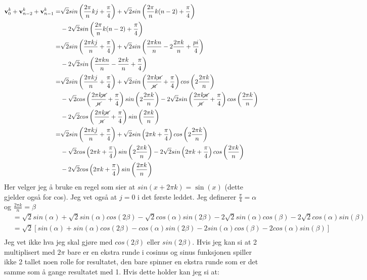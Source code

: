 \documentclass[a4paper,12pt,norsk]{article}
\begin{document}
\begin{align*}
\bold{v}^k_0 +\bold{v}^k_{n-2} + \bold{v}^k_{n-1} =& \sqrt{2}sin\left(\frac{2\pi}{n}kj + \frac{\pi}{4}\right) + \sqrt{2}sin\left(\frac{2\pi}{n}k(n-2) + \frac{\pi}{4} \right)\\ &-2\sqrt{2}sin\left(\frac{2\pi}{n}k(n-2) + \frac{\pi}{4} \right)\\
=& \sqrt{2}sin\left(\frac{2\pi kj}{n} + \frac{\pi}{4}\right) + \sqrt{2}sin\left(\frac{2\pi kn}{n} -2\frac{2\pi k}{n} + \frac{pi}{4}\right) \\
&-2\sqrt{2}sin\left(\frac{2\pi kn}{n} - \frac{2\pi k}{n} + \frac{\pi}{4} \right)\\
=& \sqrt{2}sin\left(\frac{2\pi kj}{n} + \frac{\pi}{4}\right) + \sqrt{2}sin\left(\frac{2\pi k\cancel{n}}{\cancel{n}} + \frac{\pi}{4}\right)cos\left(2\frac{2\pi k}{n} \right) \\
& - \sqrt{2}cos\left(\frac{2\pi k\cancel{n}}{\cancel{n}} + \frac{\pi}{4}\right)sin\left(2\frac{2\pi k}{n} \right) -2\sqrt{2}sin\left(\frac{2\pi k\cancel{n}}{\cancel{n}} + \frac{\pi}{4}\right)cos\left(\frac{2\pi k}{n} \right)\\
&-2\sqrt{2}cos\left(\frac{2\pi k\cancel{n}}{\cancel{n}} + \frac{\pi}{4}\right)sin\left(\frac{2\pi k}{n} \right) \\
=& \sqrt{2}sin\left(\frac{2\pi kj}{n} + \frac{\pi}{4}\right) + \sqrt{2}sin\left(2\pi k + \frac{\pi}{4}\right)cos\left(2\frac{2\pi k}{n} \right) \\
& - \sqrt{2}cos\left(2\pi k + \frac{\pi}{4}\right)sin\left(2\frac{2\pi k}{n} \right) -2\sqrt{2}sin\left(2\pi k + \frac{\pi}{4}\right)cos\left(\frac{2\pi k}{n} \right)\\
&-2\sqrt{2}cos\left(2\pi k + \frac{\pi}{4}\right)sin\left(\frac{2\pi k}{n} \right)
\end{align*}
Her velger jeg å bruke en regel som sier at $sin(x+2\pi k)=\sin(x)$ (dette gjelder også for cos). Jeg vet også at $j = 0$ i det første leddet. Jeg definerer $\frac{\pi}{4} = \alpha$ og $\frac{2\pi k}{n} = \beta$
\begin{align*}
&= \sqrt{2}sin(\alpha) + \sqrt{2}sin(\alpha)cos(2\beta) -\sqrt{2}cos(\alpha)sin(2\beta) -2\sqrt{2}sin(\alpha)cos(\beta) -2\sqrt{2}cos(\alpha)sin(\beta)\\
&= \sqrt{2}[sin(\alpha) + sin(\alpha)cos(2\beta) -cos(\alpha)sin(2\beta) -2sin(\alpha)cos(\beta) -2cos(\alpha)sin(\beta)]\\
\end{align*}
Jeg vet ikke hva jeg skal gjøre med $cos(2\beta)$ eller $sin(2\beta)$. Hvis jeg kan si at 2 multiplisert med $2\pi$ bare er en ekstra runde i cosinus og sinus funksjonen spiller ikke 2 tallet noen rolle for resultatet, den bare spinner en ekstra runde som er det samme som å gange resultatet med 1. Hvis dette holder kan jeg si at:
\end{document}
